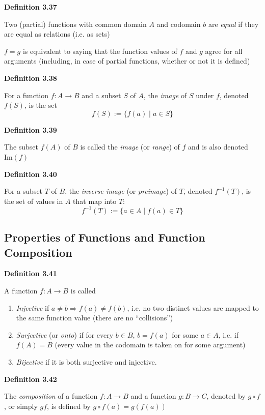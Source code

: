 \documentclass[a4paper]{report}
\newenvironment{definition}[1]{\begin{framed}\centerline{\textbf{Definition #1}}\noindent\hspace{-1.1mm}}{\end{framed}}
\begin{document}
\begin{definition}{3.37}
Two (partial) functions with common domain $A$ and codomain $b$ are \emph{equal} if they are equal as relations (i.e. as sets)
\end{definition}

$f=g$ is equivalent to saying that the function values of $f$ and $g$ agree for all arguments (including, in case of partial functions, whether or not it is defined)

\begin{definition}{3.38}
For a function $f:A\to B$ and a subset $S$ of $A$, the \emph{image} of $S$ under $f$, denoted $f(S)$, is the set \[f(S):=\{f(a)\mid a\in S\}\]
\end{definition}

\begin{definition}{3.39}
The subset $f(A)$ of $B$ is called the \emph{image} (or \emph{range}) of $f$ and is also denoted $\text{Im}(f)$
\end{definition}

\begin{definition}{3.40}
For a subset $T$ of $B$, the \emph{inverse image} (or \emph{preimage}) of $T$, denoted $f^{-1}(T)$, is the set of values in $A$ that map into $T$: \[f^{-1}(T):=\{a\in A\mid f(a)\in T\}\]
\end{definition}


\subsection{Properties of Functions and Function Composition}
\begin{definition}{3.41}
A function $f:A\to B$ is called
\begin{enumerate}
\item \emph{Injective} if $a\not=b\Rightarrow f(a)\not=f(b)$, i.e. no two distinct values are mapped to the same function value (there are no ``collisions'')
\item \emph{Surjective} (or \emph{onto}) if for every $b\in B$, $b=f(a)$ for some $a\in A$, i.e. if $f(A)=B$ (every value in the codomain is taken on for some argument)
\item \emph{Bijective} if it is both surjective and injective.  
\end{enumerate}
\end{definition}

\begin{definition}{3.42}
The \emph{composition} of a function $f:A\to B$ and a function $g:B\to C$, denoted by $g\circ f$, or simply $gf$, is defined by $g\circ f(a)=g\left( f(a)\right)$
\end{definition}
\end{document}
